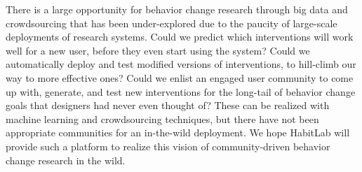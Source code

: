 There is a large opportunity for behavior change research through big data and crowdsourcing that has been under-explored due to the paucity of large-scale deployments of research systems. Could we predict which interventions will work well for a new user, before they even start using the system? Could we automatically deploy and test modified versions of interventions, to hill-climb our way to more effective ones? Could we enlist an engaged user community to come up with, generate, and test new interventions for the long-tail of behavior change goals that designers had never even thought of? These can be realized with machine learning and crowdsourcing techniques, but there have not been appropriate communities for an in-the-wild deployment. We hope HabitLab will provide such a platform to realize this vision of community-driven behavior change research  in the wild. %
